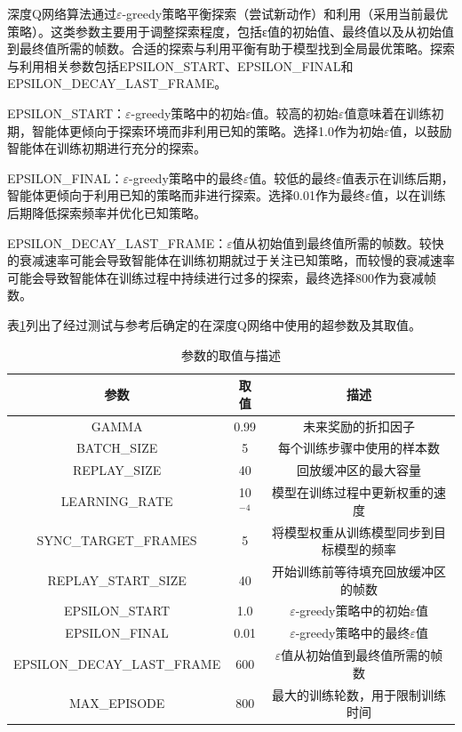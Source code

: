 深度Q网络算法通过$\varepsilon$-greedy策略平衡探索（尝试新动作）和利用（采用当前最优策略）。这类参数主要用于调整探索程度，包括ε值的初始值、最终值以及从初始值到最终值所需的帧数。合适的探索与利用平衡有助于模型找到全局最优策略。探索与利用相关参数包括EPSILON\_START、EPSILON\_FINAL和EPSILON\_DECAY\_LAST\_FRAME。

EPSILON\_START：$\varepsilon$-greedy策略中的初始$\varepsilon$值。较高的初始$\varepsilon$值意味着在训练初期，智能体更倾向于探索环境而非利用已知的策略。选择1.0作为初始$\varepsilon$值，以鼓励智能体在训练初期进行充分的探索。

EPSILON\_FINAL：$\varepsilon$-greedy策略中的最终$\varepsilon$值。较低的最终$\varepsilon$值表示在训练后期，智能体更倾向于利用已知的策略而非进行探索。选择0.01作为最终$\varepsilon$值，以在训练后期降低探索频率并优化已知策略。

EPSILON\_DECAY\_LAST\_FRAME：$\varepsilon$值从初始值到最终值所需的帧数。较快的衰减速率可能会导致智能体在训练初期就过于关注已知策略，而较慢的衰减速率可能会导致智能体在训练过程中持续进行过多的探索，最终选择800作为衰减帧数。

表\ref{demand_inf}列出了经过测试与参考后确定的在深度Q网络中使用的超参数及其取值。
\renewcommand{\arraystretch}{1.2} %
\begin{table}[htbp]
\centering
\caption{参数的取值与描述}
\label{demand_inf}
\begin{tabular}{ccc}
\toprule
参数 & 取值 & 描述       \\
\midrule
GAMMA & 0.99 & 未来奖励的折扣因子 \\ 
BATCH\_SIZE & 5 & 每个训练步骤中使用的样本数 \\ 
REPLAY\_SIZE & 40 & 回放缓冲区的最大容量 \\ 
LEARNING\_RATE & 10$^{-4}$ & 模型在训练过程中更新权重的速度 \\ 
SYNC\_TARGET\_FRAMES & 5 & 将模型权重从训练模型同步到目标模型的频率 \\ 
REPLAY\_START\_SIZE & 40 & 开始训练前等待填充回放缓冲区的帧数 \\ 
EPSILON\_START & 1.0 & $\varepsilon$-greedy策略中的初始$\varepsilon$值 \\ 
EPSILON\_FINAL & 0.01 & $\varepsilon$-greedy策略中的最终$\varepsilon$值 \\ 
EPSILON\_DECAY\_LAST\_FRAME & 600 & $\varepsilon$值从初始值到最终值所需的帧数 \\ 
MAX\_EPISODE & 800 & 最大的训练轮数，用于限制训练时间 \\ 

\bottomrule
\end{tabular}
\end{table}



